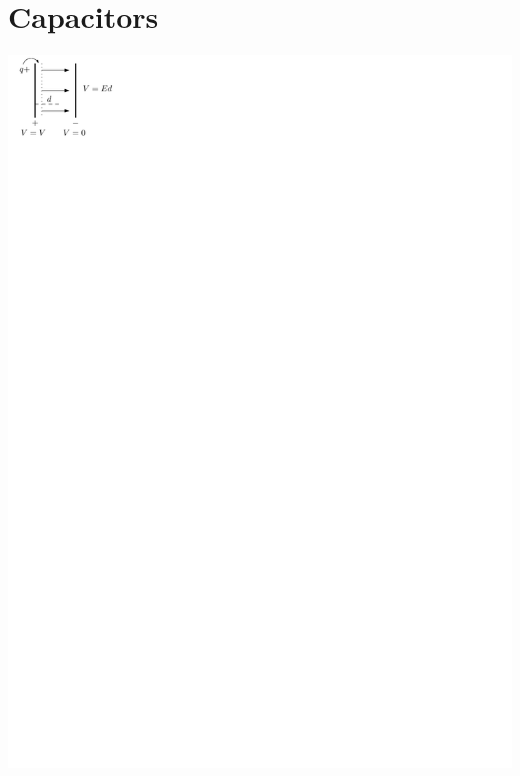 \documentclass{article}
\begin{document}
  \section{Capacitors}
    \begin{center}
      \includegraphics{figures/capacitor.pdf}
    \end{center}
\end{document}
